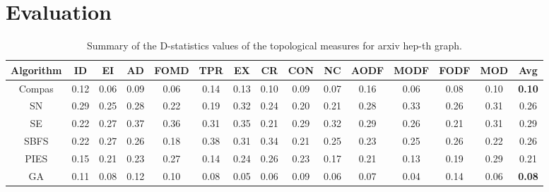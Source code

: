 \section{Evaluation}

\begin{table}
\centering
\caption{Summary of the D-statistics values of the topological measures for arxiv hep-th graph.}
\label{tab_hep-th}
\begin{adjustbox}{max width=\textwidth}
\begin{tabular}{c|c c c c c c c c c c c c c | c}
\hline
Algorithm & ID & EI & AD & FOMD & TPR & EX & CR & CON & NC & AODF & MODF & FODF & MOD & Avg\\ \hline
Compas    & 0.12 & 0.06 &0.09 & 0.06  &  0.14 & 0.13  &  0.10   & 0.09   & 0.07     &   0.16   &  0.06& 0.08   &  0.10 & {\bf 0.10}  \\ 
SN        & 0.29   & 0.25   & 0.28   &  0.22    &  0.19   & 0.32   &  0.24  &  0.20   & 0.21   & 0.28     & 0.33     &   0.26   &  0.31 & 0.26 \\ 
SE        & 0.22   &  0.27  &  0.37  &  0.36    &  0.31   &  0.35  &  0.21  &  0.29   &  0.32  &  0.29    &  0.26    & 0.21     &  0.31 & 0.29  \\ 
SBFS      &  0.22  & 0.27   &  0.26  &  0.18    &   0.38  &  0.31  & 0.34    &  0.21   & 0.25   &  0.23    & 0.25     &  0.26    &  0.22 & 0.26  \\ 
PIES      & 0.15   &  0.21  &  0.23  &  0.27    &  0.14   & 0.24    & 0.26   & 0.23    &  0.17  & 0.21     &  0.13   &  0.19    &  0.29  & 0.21 \\ 
GA        &  0.11  & 0.08   & 0.12   &   0.10   & 0.08    & 0.05   & 0.06   & 0.09    &   0.06 &  0.07    &  0.04    &  0.14 &  0.06 & {\bf 0.08}\\ \hline
\end{tabular}
\end{adjustbox}
\vspace{3mm}
\end{table}


